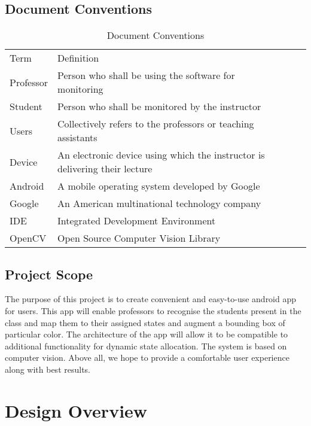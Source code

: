 \documentclass{scrreprt}
\begin{document}
\section{Document Conventions}
\begin{table}[h]
\centering
\label{label-1}
\begin{tabular}{|l|l|lll}
\cline{1-2}
Term      & Definition                                                   &  &  &  \\ \cline{1-2}
Professor & Person who shall be using the software for monitoring        &  &  &  \\ \cline{1-2}
Student   & Person who shall be monitored by the instructor              &  &  &  \\ \cline{1-2}
Users     & Collectively refers to the professors or teaching assistants &  &  &  \\ \cline{1-2}
Device     & An electronic device using which the instructor is delivering their lecture &  &  &  \\ \cline{1-2}
Android     & A mobile operating system developed by Google &  &  &  \\ \cline{1-2}
Google     & An American multinational technology company &  &  &  \\ \cline{1-2}
IDE     & Integrated Development Environment &  &  &  \\ \cline{1-2}
OpenCV     & Open Source Computer Vision Library &  &  &  \\ \cline{1-2}
\end{tabular}
\caption{Document Conventions}
\end{table}

\section{Project Scope}
The purpose of this project is to create convenient and easy-to-use android app for users.
This app will enable professors to recognise the students present in the class and map
them to their assigned states and augment a bounding box of particular color. The
architecture of the app will allow it to be compatible to additional functionality for
dynamic state allocation.
The system is based on computer vision. Above all, we hope to provide a comfortable
user experience along with best results.

\chapter{Design Overview}
\end{document}
